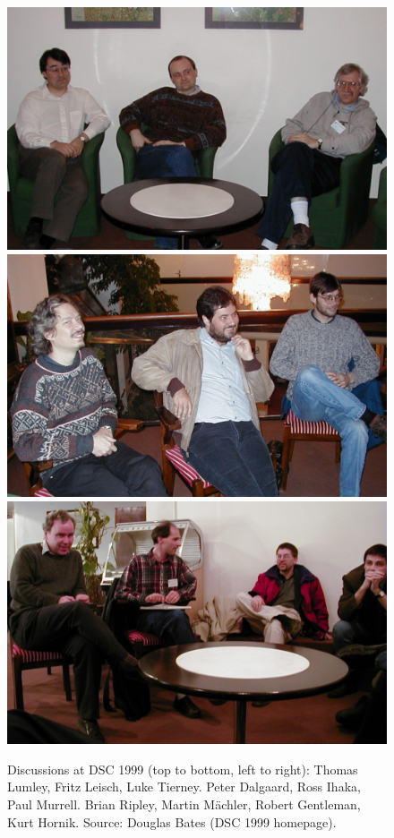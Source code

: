 \begin{figure}[p!]

{\centering \includegraphics[width=0.83\linewidth]{figures/img-dsc1999a} \includegraphics[width=0.83\linewidth]{figures/img-dsc1999b} \includegraphics[width=0.83\linewidth]{figures/img-dsc1999c} 

}

\caption{Discussions at DSC 1999 (top to bottom, left to right): Thomas Lumley, Fritz Leisch, Luke Tierney. Peter Dalgaard, Ross Ihaka, Paul Murrell. Brian Ripley, Martin Mächler, Robert Gentleman, Kurt Hornik. Source: Douglas Bates (DSC 1999 homepage).}\label{fig:dsc1999}
\end{figure}

